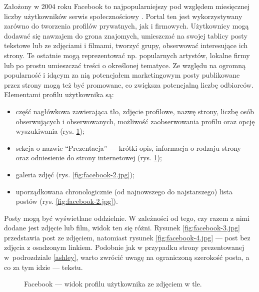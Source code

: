 \documentclass[a4paper, 12pt, twoside]{article}
\numberwithin{figure}{section}
\begin{document}
\begin{sloppypar}
Założony w 2004 roku \cite{historiafacebooka} Facebook to najpopularniejszy pod względem miesięcznej liczby użytkowników serwis społecznościowy \cite{socialmediastats}. Portal ten jest wykorzystywany zarówno do tworzenia profilów prywatnych, jak i firmowych. Użytkownicy mogą dodawać się nawzajem do grona znajomych, umieszczać na swojej tablicy posty tekstowe lub ze zdjęciami i filmami, tworzyć grupy, obserwować interesujące ich strony. Te ostatnie mogą reprezentować np. popularnych artystów, lokalne firmy lub po prostu umieszczać treści o określonej tematyce. Ze względu na ogromną popularność i idącym za nią potencjałem marketingowym posty publikowane przez strony mogą też być promowane, co zwiększa potencjalną liczbę odbiorców. Elementami profilu użytkownika są: 
\begin{itemize}
    \item część nagłówkowa zawierająca tło, zdjęcie profilowe, nazwę strony, liczbę osób obserwujących i obserwowanych, możliwość zaobserwowania profilu oraz opcję wyszukiwania (rys. \ref{fig:facebook-1.jpg});
    \item sekcja o nazwie ``Prezentacja'' --- krótki opis, informacja o rodzaju strony oraz odniesienie do strony internetowej (rys. \ref{fig:facebook-1.jpg});
    \item galeria zdjęć (rys. \ref{fig:facebook-2.jpg});
    \item uporządkowana chronologicznie (od najnowszego do najstarszego) lista postów (rys. \ref{fig:facebook-2.jpg}).
\end{itemize}
Posty mogą być wyświetlane oddzielnie. W zależności od tego, czy razem z nimi dodane jest zdjęcie lub film, widok ten się różni. Rysunek \ref{fig:facebook-3.jpg} przedstawia post ze zdjęciem, natomiast rysunek \ref{fig:facebook-4.jpg} --- post bez zdjęcia z osadzonym linkiem. Podobnie jak w przypadku strony prezentowanej w~podrozdziale \ref{ashley}, warto zwrócić uwagę na ograniczoną szerokość posta, a co za tym idzie --- tekstu.

\begin{figure}[H] 
    \centering
   \caption{Facebook --- widok profilu użytkownika ze zdjęciem w tle.}
   \label{fig:facebook-1.jpg}
\end{figure}


\end{sloppypar}
\end{document}
